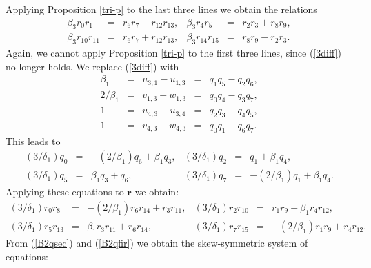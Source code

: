 \documentclass[letterpaper,10pt]{amsart}
\newcommand{\Br}{{\mathbf{r}}}
\theoremstyle{definition}
\numberwithin{equation}{section}
\begin{document}
Applying Proposition \ref{tri-p} to the last three lines we obtain the relations 
\begin{equation} \label{B2qsec} \begin{matrix} \beta_3 r_0 r_1 & = & r_6 r_7 - r_{12} r_{13}, & \beta_3 r_4 r_5 & = & r_2 r_3 + r_8 r_9, \\
\beta_3 r_{10} r_{11} & = & r_6 r_7 + r_{12} r_{13}, & \beta_3 r_{14} r_{15} & = & r_8 r_9 - r_2 r_3.
\end{matrix} 
\end{equation}
Again, we cannot apply Proposition \ref{tri-p} to the first three lines, since (\ref{3diff}) no longer holds. We replace (\ref{3diff}) with
\begin{equation} \label{3diff3} \begin{matrix} \beta_1 & = & u_{3,1}  -  u_{1,3} & = & q_1 q_5 - q_2 q_6, \\
2/\beta_1 & = & v_{1,3} - w_{1,3} & = & q_0 q_4 - q_3 q_7, \\
1 & = & u_{4,3} - u_{3,4} & = & q_2 q_3 - q_4 q_5, \\
1 & = & v_{4,3} - w_{4,3} & = & q_0 q_1 - q_6 q_7.
\end{matrix} 
\end{equation}
This leads to 
\begin{equation} \label{tripara3} \begin{matrix} (3/\delta_1) q_0 & = & -(2/\beta_1) q_6 + \beta_1 q_3 , & (3/\delta_1) q_2 & = & q_1 + \beta_1 q_4, \\
(3  /\delta_1) q_5 & = & \beta_1 q_3 + q_6, & (3 /\delta_1) q_7 & = & -(2/\beta_1) q_1 + \beta_1 q_4 . 
\end{matrix} 
\end{equation}
Applying these equations to $\Br$ we obtain:
\begin{equation} \label{B2qfir} \begin{matrix} (3 /\delta_1) r_0 r_8 & = &   -(2/\beta_1) r_6 r_{14} +  r_3 r_{11}, & (3/\delta_1) r_2 r_{10} & = & r_1 r_9 + \beta_1 r_4 r_{12}, \\
(3 /\delta_1) r_5 r_{13} & = & \beta_1 r_3 r_{11} + r_6 r_{14}, & (3/\delta_1) r_7 r_{15} & = & -(2/\beta_1) r_1 r_9 +  r_4 r_{12} . 
\end{matrix}
\end{equation}
From (\ref{B2qsec}) and (\ref{B2qfir}) we obtain the skew-symmetric system of equations:
\end{document}
